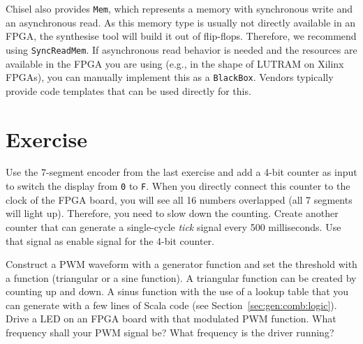 \documentclass[%
    10pt,
    headinclude, footexclude,
    openright, %
    notitlepage,
    cleardoubleempty,
    headsepline,
    pointlessnumbers,
    bibtotoc, idxtotoc,
    ]{scrbook}
\newcommand{\code}[1]{{\small{\texttt{#1}}}}
\begin{document}

Chisel also provides \code{Mem}, which represents a memory with synchronous
write and an asynchronous read. As this memory type is usually not directly available
in an FPGA, the synthesise tool will build it out of flip-flops.
Therefore, we recommend using \code{SyncReadMem}. If asynchronous read behavior is needed and
the resources are available in the FPGA you are using (e.g., in the shape of LUTRAM on Xilinx
FPGAs), you can manually implement this as a \code{BlackBox}. Vendors typically provide
code templates that can be used directly for this.



\section{Exercise}

Use the 7-segment encoder from the last exercise and add a 4-bit counter as input
to switch the display from \code{0} to \code{F}. When you directly connect this
counter to the clock of the FPGA board, you will see all 16 numbers
overlapped (all 7 segments will light up).
Therefore, you need to slow down the counting. Create another
counter that can generate a single-cycle \emph{tick} signal every 500 milliseconds.
Use that signal as enable signal for the 4-bit counter.

Construct a PWM waveform with a generator function and set the threshold with a
function (triangular or a sine function).
A triangular function can be created by counting up and down. A sinus function with the
use of a lookup table that you can generate with a few lines of Scala code
(see Section~\ref{sec:gen:comb:logic}).
Drive a LED on an FPGA board with that modulated PWM function. What frequency shall your
PWM signal be? What frequency is the driver running?
\end{document}
